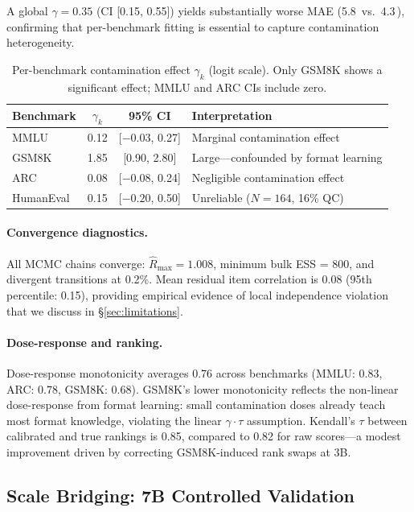 \documentclass[11pt,a4paper]{article}
\newcommand{\pp}{\,\text{pp}}
\begin{document}
A global $\gamma = 0.35$ (CI [0.15, 0.55]) yields substantially worse MAE (5.8\pp{} vs.\ 4.3\pp{}), confirming that per-benchmark fitting is essential to capture contamination heterogeneity.

\begin{table}[t]
\centering
\caption{Per-benchmark contamination effect $\gamma_k$ (logit scale). Only GSM8K shows a significant effect; MMLU and ARC CIs include zero.}
\label{tab:gamma}
\small
\begin{tabular}{lccl}
\toprule
\textbf{Benchmark} & $\gamma_k$ & \textbf{95\% CI} & \textbf{Interpretation} \\
\midrule
MMLU      & 0.12 & [$-0.03$, 0.27] & Marginal contamination effect \\
GSM8K     & 1.85 & [0.90, 2.80]     & Large---confounded by format learning \\
ARC       & 0.08 & [$-0.08$, 0.24] & Negligible contamination effect \\
HumanEval & 0.15 & [$-0.20$, 0.50] & Unreliable ($N=164$, 16\% QC) \\
\bottomrule
\end{tabular}
\end{table}

\paragraph{Convergence diagnostics.}
All MCMC chains converge: $\hat{R}_\text{max} = 1.008$, minimum bulk ESS = 800, and divergent transitions at 0.2\%. Mean residual item correlation is 0.08 (95th percentile: 0.15), providing empirical evidence of local independence violation that we discuss in \S\ref{sec:limitations}.

\paragraph{Dose-response and ranking.}
Dose-response monotonicity averages 0.76 across benchmarks (MMLU: 0.83, ARC: 0.78, GSM8K: 0.68). GSM8K's lower monotonicity reflects the non-linear dose-response from format learning: small contamination doses already teach most format knowledge, violating the linear $\gamma \cdot \tau$ assumption. Kendall's $\tau$ between calibrated and true rankings is 0.85, compared to 0.82 for raw scores---a modest improvement driven by correcting GSM8K-induced rank swaps at 3B.

\subsection{Scale Bridging: 7B Controlled Validation}
\label{sec:7b_results}
\end{document}
